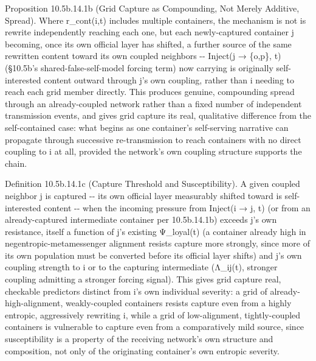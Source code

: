 \documentclass[
]{article}
\begin{document}
Proposition 10.5b.14.1b (Grid Capture as Compounding, Not Merely
Additive, Spread). Where r\_cont(i,t) includes multiple containers, the
mechanism is not is rewrite independently reaching each one, but each
newly-captured container j becoming, once its own official layer has
shifted, a further source of the same rewritten content toward its own
coupled neighbors -\/- Inject(j → \{o,p\}, t) (§10.5b's
shared-false-self-model forcing term) now carrying is originally
self-interested content outward through j's own coupling, rather than i
needing to reach each grid member directly. This produces genuine,
compounding spread through an already-coupled network rather than a
fixed number of independent transmission events, and gives grid capture
its real, qualitative difference from the self-contained case: what
begins as one container's self-serving narrative can propagate through
successive re-transmission to reach containers with no direct coupling
to i at all, provided the network's own coupling structure supports the
chain.

Definition 10.5b.14.1c (Capture Threshold and Susceptibility). A given
coupled neighbor j is captured -\/- its own official layer measurably
shifted toward is self-interested content -\/- when the incoming
pressure from Inject(i → j, t) (or from an already-captured intermediate
container per 10.5b.14.1b) exceeds j's own resistance, itself a function
of j's existing Ψ\_loyal(t) (a container already high in
negentropic-metamessenger alignment resists capture more strongly, since
more of its own population must be converted before its official layer
shifts) and j's own coupling strength to i or to the capturing
intermediate (Λ\_ij(t), stronger coupling admitting a stronger forcing
signal). This gives grid capture real, checkable predictors distinct
from i's own individual severity: a grid of already-high-alignment,
weakly-coupled containers resists capture even from a highly entropic,
aggressively rewriting i, while a grid of low-alignment, tightly-coupled
containers is vulnerable to capture even from a comparatively mild
source, since susceptibility is a property of the receiving network's
own structure and composition, not only of the originating container's
own entropic severity.
\end{document}
